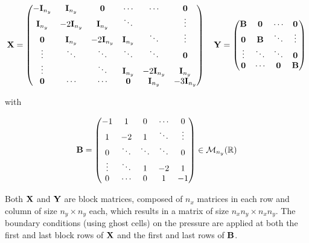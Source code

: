 \begin{equation*}
  \boldsymbol{\mathrm{X}} = \begin{pmatrix}
    -\boldsymbol{\mathrm{I}}_{n_y} & \boldsymbol{\mathrm{I}}_{n_y}   & \boldsymbol{\mathrm{0}}         & \cdots       & \cdots         & \boldsymbol{\mathrm{0}}         \\
    \boldsymbol{\mathrm{I}}_{n_y}  & -2\boldsymbol{\mathrm{I}}_{n_y} & \boldsymbol{\mathrm{I}}_{n_y}   & \ddots       &                & \vdots         \\
    \boldsymbol{\mathrm{0}}        & \boldsymbol{\mathrm{I}}_{n_y}   & -2\boldsymbol{\mathrm{I}}_{n_y} & \boldsymbol{\mathrm{I}}_{n_y} & \ddots         & \vdots         \\
    \vdots        & \ddots         & \ddots         & \ddots       & \ddots         & \boldsymbol{\mathrm{0}}         \\
    \vdots        &                & \ddots         & \boldsymbol{\mathrm{I}}_{n_y} & -2\boldsymbol{\mathrm{I}}_{n_y} & \boldsymbol{\mathrm{I}}_{n_y}  \\
    \boldsymbol{\mathrm{0}}        & \cdots         & \cdots         & \boldsymbol{\mathrm{0}}       & \boldsymbol{\mathrm{I}}_{n_y}   & -3\boldsymbol{\mathrm{I}}_{n_y} \\
  \end{pmatrix}\quad
  \boldsymbol{\mathrm{Y}} = \begin{pmatrix}
    \boldsymbol{\mathrm{B}} & \boldsymbol{\mathrm{0}} & \cdots & \boldsymbol{\mathrm{0}} \\
    \boldsymbol{\mathrm{0}} & \boldsymbol{\mathrm{B}} & \ddots & \vdots \\
    \vdots & \ddots & \ddots & \boldsymbol{\mathrm{0}} \\
    \boldsymbol{\mathrm{0}} & \cdots & \boldsymbol{\mathrm{0}} & \boldsymbol{\mathrm{B}} \\
  \end{pmatrix}
\end{equation*}

with

$$
  \boldsymbol{\mathrm{B}} = \begin{pmatrix}
    -1     & 1      & 0      & \cdots & 0      \\
    1      & -2     & 1      & \ddots & \vdots \\
    0      & \ddots & \ddots & \ddots & 0      \\
    \vdots & \ddots & 1      & -2     & 1      \\
    0      & \cdots & 0      & 1      & -1     \\
  \end{pmatrix}\in\mathcal{M}_{n_y}(\mathbb{R})
$$

Both $\boldsymbol{\mathrm{X}}$ and $\boldsymbol{\mathrm{Y}}$ are block matrices, composed of $n_x$ matrices in each row and column of size $n_y\times n_y$ each, which results in a matrix of size $n_xn_y\times n_xn_y$. 
The boundary conditions (using ghost cells) on the pressure are applied at both the first and last block rows of $\boldsymbol{\mathrm{X}}$ and the first and last rows of $\boldsymbol{\mathrm{B}}$.

